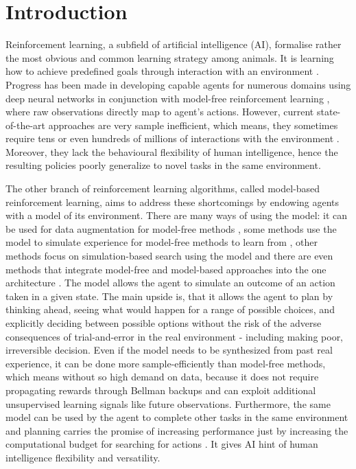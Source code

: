 \section{Introduction}

Reinforcement learning, a subfield of artificial intelligence (AI), formalise rather the most obvious and common learning strategy among animals. It is learning how to achieve predefined goals through interaction with an environment \cite{Book.RLAI}. Progress has been made in developing capable agents for numerous domains using deep neural networks in conjunction with model-free reinforcement learning \cite{Algo.Rainbow}\cite{Algo.A3C}\cite{Algo.PPO}, where raw observations directly map to agent's actions. However, current state-of-the-art approaches are very sample inefficient, which means, they sometimes require tens or even hundreds of millions of interactions with the environment \cite{Benchmark.RevisitingALE}. Moreover, they lack the behavioural flexibility of human intelligence, hence the resulting policies poorly generalize to novel tasks in the same environment.

The other branch of reinforcement learning algorithms, called model-based reinforcement learning, aims to address these shortcomings by endowing agents with a model of its environment. There are many ways of using the model: it can be used for data augmentation for model-free methods \cite{Algo.MBVE}, some methods use the model to simulate experience for model-free methods to learn from \cite{Algo.WorldModels}, other methods focus on simulation-based search using the model \cite{Algo.AlphaZero} and there are even methods that integrate model-free and model-based approaches into the one architecture \cite{Algo.I2A}. The model allows the agent to simulate an outcome of an action taken in a given state. The main upside is, that it allows the agent to plan by thinking ahead, seeing what would happen for a range of possible choices, and explicitly deciding between possible options without the risk of the adverse consequences of trial-and-error in the real environment - including making poor, irreversible decision. Even if the model needs to be synthesized from past real experience, it can be done more sample-efficiently than model-free methods, which means without so high demand on data, because it does not require propagating rewards through Bellman backups and can exploit additional unsupervised learning signals like future observations. Furthermore, the same model can be used by the agent to complete other tasks in the same environment \cite{Algo.I2A} and planning carries the promise of increasing performance just by increasing the computational budget for searching for actions \cite{Algo.AlphaGoZero}. It gives AI hint of human intelligence flexibility and versatility.

